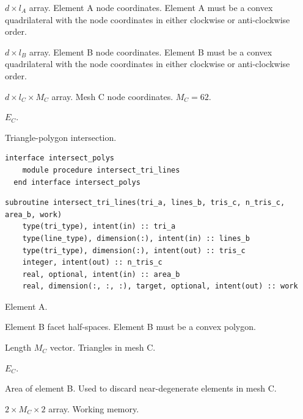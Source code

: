 \documentclass{article}
\begin{document}
\begin{description}[font=\ttfamily\bfseries,leftmargin=2.2\parindent,labelindent=1.7\parindent,noitemsep]
  \item[quad\_a] $d \times l_A$ array. Element A node coordinates. Element A
    must be a convex quadrilateral with the node coordinates in either clockwise
    or anti-clockwise order.
  \item[quad\_b] $d \times l_B$ array. Element B node coordinates. Element B
    must be a convex quadrilateral with the node coordinates in either clockwise
    or anti-clockwise order.
  \item[tris\_c] $d \times l_C \times M_C$ array. Mesh C node coordinates.
    $M_C = 62$.
  \item[n\_tris\_c] $E_C$.
\end{description}

\noindent Triangle-polygon intersection.
  
\begin{lstlisting}[language=FORTRAN]
  interface intersect_polys
    module procedure intersect_tri_lines
  end interface intersect_polys
\end{lstlisting}

\begin{lstlisting}[language=FORTRAN]
  subroutine intersect_tri_lines(tri_a, lines_b, tris_c, n_tris_c, area_b, work)
    type(tri_type), intent(in) :: tri_a
    type(line_type), dimension(:), intent(in) :: lines_b
    type(tri_type), dimension(:), intent(out) :: tris_c
    integer, intent(out) :: n_tris_c
    real, optional, intent(in) :: area_b
    real, dimension(:, :, :), target, optional, intent(out) :: work
\end{lstlisting}

\begin{description}[font=\ttfamily\bfseries,leftmargin=2.2\parindent,labelindent=1.7\parindent,noitemsep]
  \item[tri\_a] Element A.
  \item[lines\_b] Element B facet half-spaces. Element B must be a convex
    polygon.
  \item[tris\_c] Length $M_C$ vector. Triangles in mesh C.
  \item[n\_tris\_c] $E_C$.
  \item[area\_b] Area of element B. Used to discard near-degenerate elements in
    mesh C.
  \item[work] $2 \times M_C \times 2$ array. Working memory.
\end{description}
\end{document}
